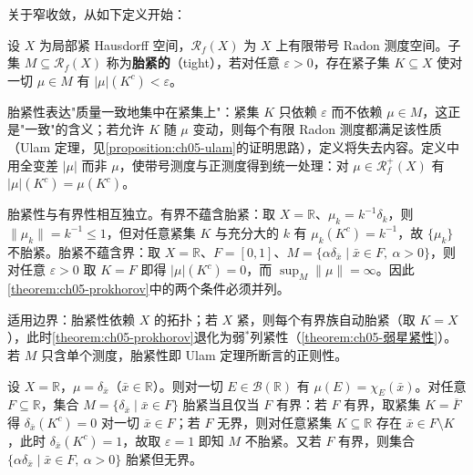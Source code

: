 \documentclass[../../main.tex]{subfiles}%
\begin{document}
关于窄收敛，从如下定义开始：

\begin{definition}\label{definition:ch05-胎紧}
设 $X$ 为局部紧 Hausdorff 空间，$\mathscr{R}_f(X)$ 为 $X$ 上有限带号 Radon 测度空间。子集 $M\subseteq\mathscr{R}_f(X)$ 称为\textbf{胎紧的}（tight），若对任意 $\varepsilon>0$，存在紧子集 $K\subseteq X$ 使对一切 $\mu\in M$ 有 $|\mu|(K^c)<\varepsilon$。
\end{definition}

\begin{remark}\label{remark:ch05-胎紧动机}
胎紧性表达"质量一致地集中在紧集上"：紧集 $K$ 只依赖 $\varepsilon$ 而不依赖 $\mu\in M$，这正是"一致"的含义；若允许 $K$ 随 $\mu$ 变动，则每个有限 Radon 测度都满足该性质（Ulam 定理，见\cref{proposition:ch05-ulam}的证明思路），定义将失去内容。定义中用全变差 $|\mu|$ 而非 $\mu$，使带号测度与正测度得到统一处理：对 $\mu\in\mathscr{R}^+_f(X)$ 有 $|\mu|(K^c)=\mu(K^c)$。

胎紧性与有界性相互独立。有界不蕴含胎紧：取 $X=\mathbb{R}$、$\mu_k=k^{-1}\delta_k$，则 $\|\mu_k\|=k^{-1}\leqslant1$，但对任意紧集 $K$ 与充分大的 $k$ 有 $\mu_k(K^c)=k^{-1}$，故 $\{\mu_k\}$ 不胎紧。胎紧不蕴含界：取 $X=\mathbb{R}$、$F=[0,1]$、$M=\{\alpha\delta_{\bar x}\mid\bar x\in F,\ \alpha>0\}$，则对任意 $\varepsilon>0$ 取 $K=F$ 即得 $|\mu|(K^c)=0$，而 $\sup_M\|\mu\|=\infty$。因此\cref{theorem:ch05-prokhorov}中的两个条件必须并列。

适用边界：胎紧性依赖 $X$ 的拓扑；若 $X$ 紧，则每个有界族自动胎紧（取 $K=X$），此时\cref{theorem:ch05-prokhorov}退化为弱$^*$列紧性（\cref{theorem:ch05-弱星紧性}）。若 $M$ 只含单个测度，胎紧性即 Ulam 定理所断言的正则性。
\end{remark}

\begin{example}\label{example:ch05-胎紧}
设 $X=\mathbb{R}$，$\mu=\delta_{\bar x}$（$\bar x\in\mathbb{R}$）。则对一切 $E\in\mathscr{B}(\mathbb{R})$ 有 $\mu(E)=\chi_E(\bar x)$。对任意 $F\subseteq\mathbb{R}$，集合 $M=\{\delta_{\bar x}\mid\bar x\in F\}$ 胎紧当且仅当 $F$ 有界：若 $F$ 有界，取紧集 $K=\overline{F}$ 得 $\delta_{\bar x}(K^c)=0$ 对一切 $\bar x\in F$；若 $F$ 无界，则对任意紧集 $K\subseteq\mathbb{R}$ 存在 $\bar x\in F\setminus K$，此时 $\delta_{\bar x}(K^c)=1$，故取 $\varepsilon=1$ 即知 $M$ 不胎紧。又若 $F$ 有界，则集合 $\{\alpha\delta_{\bar x}\mid\bar x\in F,\ \alpha>0\}$ 胎紧但无界。
\end{example}
\end{document}
